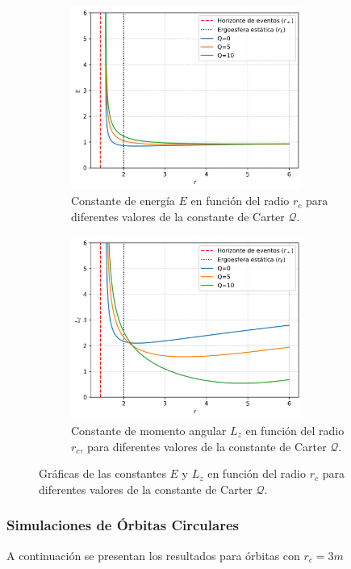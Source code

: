 \begin{figure}[H]
\begin{subfigure}{0.5\textwidth}
\includegraphics[width=0.9\linewidth, height=6cm]{AgujerosNegros/kerr/geodesics_plots/circular_orbits_E_vs_r.png} 
\caption{Constante de energía $E$ en función del radio $r_c$ para diferentes valores de la constante de Carter $\mathcal{Q}$.}
\end{subfigure}
\begin{subfigure}{0.5\textwidth}
\includegraphics[width=0.9\linewidth, height=6cm]{AgujerosNegros/kerr/geodesics_plots/circular_orbits_Lz_vs_r.png}
\caption{Constante de momento angular $L_z$ en función del radio $r_c$, para diferentes valores de la constante de Carter $\mathcal{Q}$.}
\end{subfigure}
\caption{Gráficas de las constantes $E$ y $L_z$ en función del radio $r_c$ para diferentes valores de la constante de Carter $\mathcal{Q}$.}
\end{figure}

\subsubsection{Simulaciones de Órbitas Circulares }
A continuación se presentan los resultados para  órbitas con $r_c = 3m$

